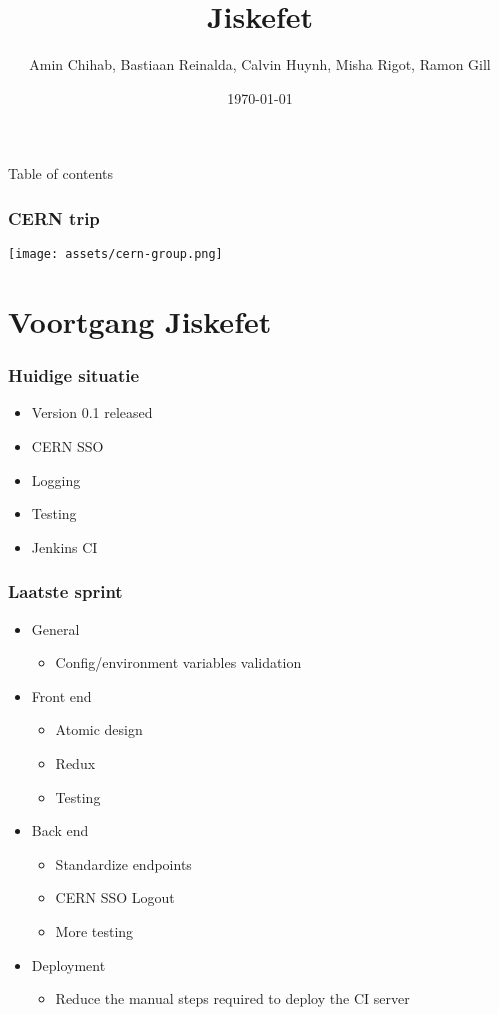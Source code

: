 \documentclass[12pt]{beamer}
\title{Jiskefet}
\author{Amin Chihab, Bastiaan Reinalda, Calvin Huynh, Misha Rigot, Ramon Gill}
\date{\today}
\begin{document}
	\begin{frame}
	\titlepage
	\end{frame}

	\begin{frame}{Table of contents}
		\tableofcontents
    \end{frame}
    
    \begin{frame}
        \frametitle{CERN trip}
   		\texttt{[image: assets/cern-group.png]}
    \end{frame}

    \section{Voortgang Jiskefet}
    \begin{frame}
        \frametitle{Huidige situatie}
        \begin{itemize}
            \item Version 0.1 released
            \item CERN SSO
            \item Logging
            \item Testing
            \item Jenkins CI
        \end{itemize}
    \end{frame}

    \begin{frame}
        \frametitle{Laatste sprint}
        \begin{itemize}
            \item General
            \begin{itemize}
                \item Config/environment variables validation
            \end{itemize}
            \item Front end
            \begin{itemize}
                \item Atomic design
                \item Redux
                \item Testing
            \end{itemize}
            \item Back end
            \begin{itemize}
                \item Standardize endpoints
                \item CERN SSO Logout
                \item More testing
            \end{itemize}
            \item Deployment
            \begin{itemize}
                \item Reduce the manual steps required to deploy the CI server
            \end{itemize}
        \end{itemize}
    \end{frame}
\end{document}
